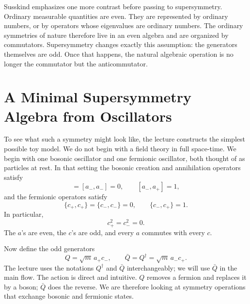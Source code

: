 Susskind emphasizes one more contrast before passing to supersymmetry. Ordinary measurable quantities are even. They are represented by ordinary numbers, or by operators whose eigenvalues are ordinary numbers. The ordinary symmetries of nature therefore live in an even algebra and are organized by commutators. Supersymmetry changes exactly this assumption: the generators themselves are odd. Once that happens, the natural algebraic operation is no longer the commutator but the anticommutator.

\section{A Minimal Supersymmetry Algebra from Oscillators}

To see what such a symmetry might look like, the lecture constructs the simplest possible toy model. We do not begin with a field theory in full space-time. We begin with one bosonic oscillator and one fermionic oscillator, both thought of as particles at rest. In that setting the bosonic creation and annihilation operators satisfy
\begin{equation}
[a_+,a_+]=[a_-,a_-]=0,
\qquad
[a_-,a_+]=1,
\end{equation}
and the fermionic operators satisfy
\begin{equation}
\{c_+,c_+\}=\{c_-,c_-\}=0,
\qquad
\{c_-,c_+\}=1.
\end{equation}
In particular,
\begin{equation}
c_+^2=c_-^2=0.
\end{equation}
The \(a\)'s are even, the \(c\)'s are odd, and every \(a\) commutes with every \(c\).

Now define the odd generators
\begin{equation}
Q=\sqrt{m}\,a_+c_-,
\qquad
\bar Q=Q^\dagger=\sqrt{m}\,a_-c_+.
\end{equation}
The lecture uses the notations \(Q^\dagger\) and \(\bar Q\) interchangeably; we will use \(\bar Q\) in the main flow. The action is direct and intuitive. \(Q\) removes a fermion and replaces it by a boson; \(\bar Q\) does the reverse. We are therefore looking at symmetry operations that exchange bosonic and fermionic states.

